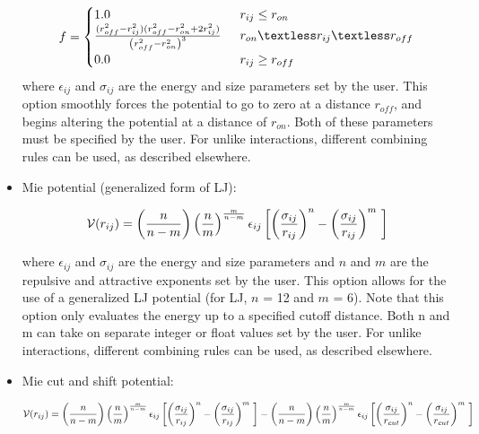 \begin{itemize}
\begin{eqnarray}
	f = 
	\begin{cases}
	
		1.0 \, \, \, &  r_ {ij}  \le r_{on} \\
		\frac { (r_{off}^2 - r_{ij}^2) (r_{off}^2 - r_{on}^2 + 2r_{ij}^2)} {\left ( r_{off}^2 - r_{on}^2 \right )^3}  \, \, \,  & r_{on} \textless r_{ij} \textless r_{off}\\
		0.0 \, \, \, & r_{ij} \ge r_{off} 
		
	\end{cases}
\end{eqnarray}
where $\epsilon_{ij}$ and $\sigma_{ij}$ are the energy and size
parameters set by the user. This option smoothly forces the potential
to go to zero at a distance $r_{off}$, and begins altering the
potential at a distance of $r_{on}$. Both of these parameters must be
specified by the user. For unlike interactions, different 
combining rules can be used, as described elsewhere.



\item Mie potential (generalized form of LJ):

\begin{equation}
 {\cal V}(r_{ij})=  \left ( \frac{n}{n-m} \right ) \left ( \frac {n}{m} \right )^{\frac{m}{n-m}}\epsilon_{ij} \left [  \left ( \frac {\sigma_{ij}} { r_{ij} }\right )^{n} - \left ( \frac {\sigma_{ij}} { r_{ij} }\right )^{m}\ \right  ] 
 \label{Eq:mie}
\end{equation}



where $\epsilon_{ij}$ and $\sigma_{ij}$ are the energy and size
parameters and $n$ and $m$ are the repulsive and attractive exponents set by the user. This option allows for the use of a generalized LJ potential (for LJ, $n$ = 12 and $m$ = 6).  Note that this
option only evaluates the energy up to a specified cutoff
distance. Both n and m can take on separate integer or float values set by the user. For unlike interactions, different 
combining rules can be used, as described elsewhere.

\item Mie cut and shift potential:

\begin{equation}
 {\cal V}(r_{ij})=  \left ( \frac{n}{n-m} \right ) \left ( \frac {n}{m} \right )^{\frac{m}{n-m}}\epsilon_{ij} \left [  \left ( \frac {\sigma_{ij}} { r_{ij} }\right )^{n} - \left ( \frac {\sigma_{ij}} { r_{ij} }\right )^{m}\ \right  ] -  \left ( \frac{n}{n-m} \right ) \left ( \frac {n}{m} \right )^{\frac{m}{n-m}}\epsilon_{ij} \left [  \left ( \frac {\sigma_{ij}} { r_{cut}}\right )^{n} - \left ( \frac {\sigma_{ij}} { r_{cut} }\right )^{m}\ \right]  
 \label{Eq:mie_cut_shift}
\end{equation}




\end{itemize}
